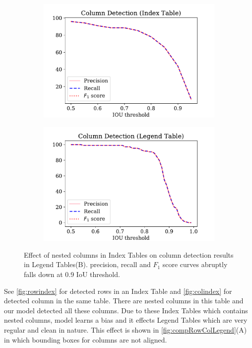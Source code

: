 \begin{figure}[h!]
\centering
\begin{subfigure}{0.48\linewidth}
  \centering
  \includegraphics[width=\linewidth]{col_index_pRf.pdf}
    \caption{}
    \label{}
\end{subfigure}
\begin{subfigure}{0.48\linewidth}
  \centering
  \includegraphics[width=\linewidth]{col_legend_pRf.pdf}
    \caption{}
    \label{}
\end{subfigure}
\caption{Effect of nested columns in Index Tables on column detection results in Legend Tables(B). precision, recall and $F_1$ score curves abruptly falls down at 0.9 IoU threshold.}
\label{fig:Col_index_legend_graph}
\end{figure}
See \autoref{fig:rowindex} for detected rows in an Index Table and \autoref{fig:colindex} for detected column in the same table. There are nested columns in this table and our model detected all these columns. Due to these Index Tables which contains nested columns, model learns a bias and it effects Legend Tables which are very regular and clean in nature. This effect is shown in \autoref{fig:compRowColLegend}(A) in which bounding boxes for columns are not aligned.
